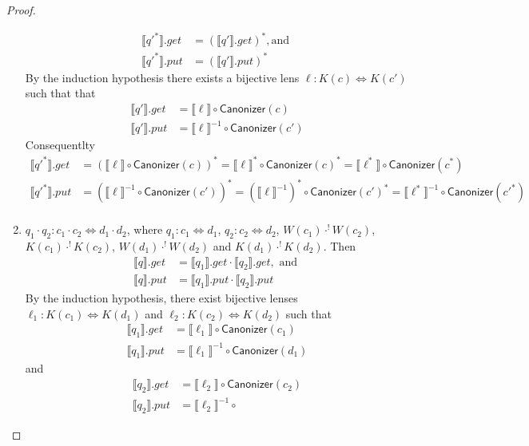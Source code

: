 \documentclass[acmsmall,review,anonymous]{acmart}\settopmatter{printfolios=true,printccs=false,printacmref=false}
\newcommand{\kw}[1]{\ensuremath{\mathsf{#1}}}
\newcommand{\canonizer}{\ensuremath{\kw{Canonizer}}}
\begin{document}
\begin{proof}
\begin{enumerate}
\begin{align*}
\llbracket {q'}^* \rrbracket.get &= (\llbracket q' \rrbracket.get)^*, \text{
and }\\
\llbracket {q'}^* \rrbracket.put &= (\llbracket q' \rrbracket.put)^*
\end{align*}
By the induction hypothesis there exists a bijective lens $\ell : K(c)
\Leftrightarrow K(c')$ such that
that
\begin{align*}
\llbracket q' \rrbracket.get &= \llbracket \ell \rrbracket \circ
\canonizer(c)\\
\llbracket q' \rrbracket.put &= {\llbracket \ell \rrbracket}^{-1} \circ
\canonizer(c')
\end{align*}
Consequentlty
\begin{align*}
\llbracket {q'}^* \rrbracket.get &= (\llbracket \ell \rrbracket \circ
\canonizer(c))^* = \llbracket \ell \rrbracket^* \circ
\canonizer(c)^* = \llbracket \ell^* \rrbracket \circ
\canonizer(c^*)\\
\llbracket {q'}^* \rrbracket.put &= (\llbracket \ell \rrbracket^{-1} \circ
\canonizer(c'))^* = (\llbracket \ell \rrbracket^{-1})^* \circ
\canonizer(c')^* = \llbracket \ell^* \rrbracket^{-1} \circ
\canonizer(c'^*)\\
\end{align*}
\item
$q_1 \cdot q_2: c_1 \cdot c_2 \Leftrightarrow d_1 \cdot d_2$, where $q_1 : c_1
\Leftrightarrow d_1 $,  $q_2 : c_2 \Leftrightarrow d_2$, $W(c_1)
\cdot^! W(c_2)$, $K(c_1) \cdot^! K(c_2)$, $W(d_1) \cdot^! W(d_2)$ and $
K(d_1) \cdot^! K(d_2)$. Then
\begin{align*}
\llbracket q \rrbracket.get &= \llbracket q_1 \rrbracket.get \cdot \llbracket
q_2 \rrbracket.get, \text{ and }\\
\llbracket q \rrbracket.put &= \llbracket q_1 \rrbracket.put \cdot \llbracket
q_2 \rrbracket.put
\end{align*}
By the induction hypothesis, there exist bijective lenses $\ell_1 : K(c_1)
\Leftrightarrow K(d_1)$ and $\ell_2 : K(c_2) \Leftrightarrow K(d_2)$ such that
\begin{align*}
\llbracket q_1 \rrbracket.get &= \llbracket \ell_1 \rrbracket \circ
\canonizer(c_1)\\
\llbracket q_1 \rrbracket.put &= {\llbracket \ell_1 \rrbracket}^{-1} \circ
\canonizer(d_1)
\end{align*}
and
\begin{align*}
\llbracket q_2 \rrbracket.get &= \llbracket \ell_2 \rrbracket \circ
\canonizer(c_2)\\
\llbracket q_2 \rrbracket.put &= {\llbracket \ell_2 \rrbracket}^{-1} \circ

\end{align*}
\end{enumerate}
\end{proof}
\end{document}
